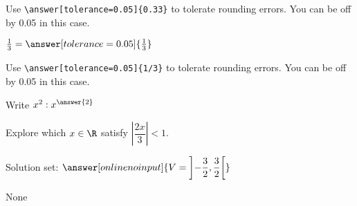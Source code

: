 \documentclass{ximera}
\begin{document}
\begin{exercise}
\begin{question}
            Use \verb|\answer[tolerance=0.05]{0.33}| to tolerate rounding errors. You can be off by 0.05 in this case.
        \end{question}

        \begin{question}
            $\frac{1}{3} =  \answer[tolerance=0.05]{\frac{1}{3}}$  

            Use \verb|\answer[tolerance=0.05]{1/3}| to tolerate rounding errors. You can be off by 0.05 in this case.
        \end{question}




        \begin{question} Write $x^2: x^{\answer{2}}$
        \end{question}


    \end{exercise}

    \begin{example} Explore which $x\in \R$ satisfy $\left|\dfrac{2x}{3}\right|<1$.

        Solution set: $\answer[onlinenoinput]{\displaystyle
            V=\left]-\frac{3}{2},\frac{3}{2}\right[}$
        \begin{oplossing}
            None
        \end{oplossing}
    \end{example}
\end{document}
